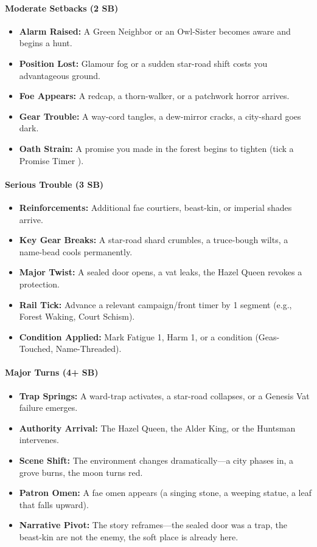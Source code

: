 \paragraph{Moderate Setbacks (2 SB)}
\begin{itemize}
\item \textbf{Alarm Raised:} A Green Neighbor or an Owl-Sister becomes aware and begins a hunt.
\item \textbf{Position Lost:} Glamour fog or a sudden star-road shift costs you advantageous ground.
\item \textbf{Foe Appears:} A redcap, a thorn-walker, or a patchwork horror arrives.
\item \textbf{Gear Trouble:} A way-cord tangles, a dew-mirror cracks, a city-shard goes dark.
\item \textbf{Oath Strain:} A promise you made in the forest begins to tighten (tick a Promise Timer ).
\end{itemize}

\paragraph{Serious Trouble (3 SB)}
\begin{itemize}
\item \textbf{Reinforcements:} Additional fae courtiers, beast-kin, or imperial shades arrive.
\item \textbf{Key Gear Breaks:} A star-road shard crumbles, a truce-bough wilts, a name-bead cools permanently.
\item \textbf{Major Twist:} A sealed door opens, a vat leaks, the Hazel Queen revokes a protection.
\item \textbf{Rail Tick:} Advance a relevant campaign/front timer by 1 segment (e.g., Forest Waking, Court Schism).
\item \textbf{Condition Applied:} Mark Fatigue 1, Harm 1, or a condition (Geas-Touched, Name-Threaded).
\end{itemize}

\paragraph{Major Turns (4+ SB)}
\begin{itemize}
\item \textbf{Trap Springs:} A ward-trap activates, a star-road collapses, or a Genesis Vat failure emerges.
\item \textbf{Authority Arrival:} The Hazel Queen, the Alder King, or the Huntsman intervenes.
\item \textbf{Scene Shift:} The environment changes dramatically---a city phases in, a grove burns, the moon turns red.
\item \textbf{Patron Omen:} A fae omen appears (a singing stone, a weeping statue, a leaf that falls upward).
\item \textbf{Narrative Pivot:} The story reframes---the sealed door was a trap, the beast-kin are not the enemy, the soft place is already here.
\end{itemize}

